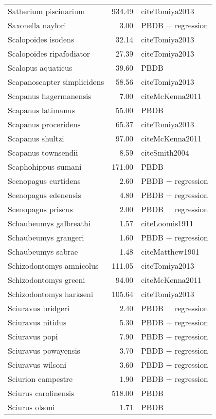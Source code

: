 \begin{table}[ht]
\begin{tabular}{lrl}
  Satherium piscinarium & 934.49 & cite{Tomiya2013} \\ 
  Saxonella naylori & 3.00 & PBDB + regression \\ 
  Scalopoides isodens & 32.14 & cite{Tomiya2013} \\ 
  Scalopoides ripafodiator & 27.39 & cite{Tomiya2013} \\ 
  Scalopus aquaticus & 39.60 & PBDB \\ 
  Scapanoscapter simplicidens & 58.56 & cite{Tomiya2013} \\ 
  Scapanus hagermanensis & 7.00 & cite{McKenna2011} \\ 
  Scapanus latimanus & 55.00 & PBDB \\ 
  Scapanus proceridens & 65.37 & cite{Tomiya2013} \\ 
  Scapanus shultzi & 97.00 & cite{McKenna2011} \\ 
  Scapanus townsendii & 8.59 & cite{Smith2004} \\ 
  Scaphohippus sumani & 171.00 & PBDB \\ 
  Scenopagus curtidens & 2.60 & PBDB + regression \\ 
  Scenopagus edenensis & 4.80 & PBDB + regression \\ 
  Scenopagus priscus & 2.00 & PBDB + regression \\ 
  Schaubeumys galbreathi & 1.57 & cite{Loomis1911} \\ 
  Schaubeumys grangeri & 1.60 & PBDB + regression \\ 
  Schaubeumys sabrae & 1.48 & cite{Matthew1901} \\ 
  Schizodontomys amnicolus & 111.05 & cite{Tomiya2013} \\ 
  Schizodontomys greeni & 94.00 & cite{McKenna2011} \\ 
  Schizodontomys harkseni & 105.64 & cite{Tomiya2013} \\ 
  Sciuravus bridgeri & 2.40 & PBDB + regression \\ 
  Sciuravus nitidus & 5.30 & PBDB + regression \\ 
  Sciuravus popi & 7.90 & PBDB + regression \\ 
  Sciuravus powayensis & 3.70 & PBDB + regression \\ 
  Sciuravus wilsoni & 3.60 & PBDB + regression \\ 
  Sciurion campestre & 1.90 & PBDB + regression \\ 
  Sciurus carolinensis & 518.00 & PBDB \\ 
  Sciurus olsoni & 1.71 & PBDB \\ 

\end{tabular}
\end{table}
